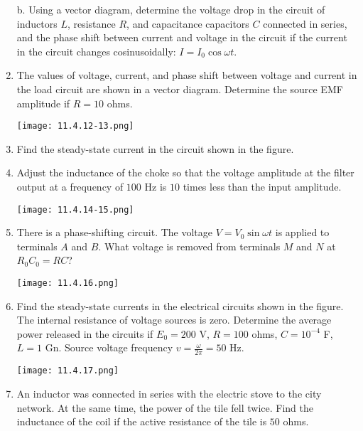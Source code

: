 \documentclass{article}
\begin{document}
\begin{enumerate}[label=11.4.\arabic*]
b. Using a vector diagram, determine the voltage drop in the circuit of inductors $L$, resistance $R$, and capacitance capacitors $C$ connected in series, and the phase shift between current and voltage in the circuit if the current in the circuit changes cosinusoidally: $I = I_0 \cos \omega t$.

\item The values of voltage, current, and phase shift between voltage and current in the load circuit are shown in a vector diagram. Determine the source EMF amplitude if $R = 10$ ohms.

\begin{center}
    \texttt{[image: 11.4.12-13.png]}
\end{center}


\item Find the steady-state current in the circuit shown in the figure.

\item Adjust the inductance of the choke so that the voltage amplitude at the filter output at a frequency of $100$ Hz is $10$ times less than the input amplitude.

\begin{center}
    \texttt{[image: 11.4.14-15.png]}
\end{center}


\item There is a phase-shifting circuit. The voltage $V = V_0 \sin \omega t$ is applied to terminals $A$ and $B$. What voltage is removed from terminals $M$ and $N$ at $R_0C_0 = RC$?

\begin{center}
    \texttt{[image: 11.4.16.png]}
\end{center}


\item Find the steady-state currents in the electrical circuits shown in the figure. The internal resistance of voltage sources is zero. Determine the average power released in the circuits if $E_0 = 200$ V, $R = 100$ ohms, $C = 10^{-4}$ F, $L = 1$ Gn. Source voltage frequency $v = \frac{\omega}{2 \pi} = 50$ Hz.

\begin{center}
    \texttt{[image: 11.4.17.png]}
\end{center}

\item An inductor was connected in series with the electric stove to the city network. At the same time, the power of the tile fell twice. Find the inductance of the coil if the active resistance of the tile is $50$ ohms.


\end{enumerate}
\end{document}
